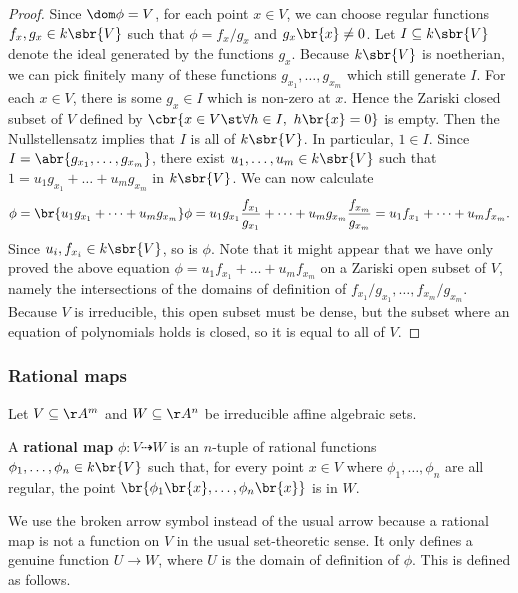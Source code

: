 \begin{proof}
Since $ \dom \phi = V $, for each point $ x \in V $, we can choose regular functions $ f_x, g_x \in k\sbr{V} $ such that $ \phi = f_x / g_x $ and $ g_x\br{x} \ne 0 $. Let $ I \subseteq k\sbr{V} $ denote the ideal generated by the functions $ g_x $. Because $ k\sbr{V} $ is noetherian, we can pick finitely many of these functions $ g_{x_1}, \dots, g_{x_m} $ which still generate $ I $. For each $ x \in V $, there is some $ g_x \in I $ which is non-zero at $ x $. Hence the Zariski closed subset of $ V $ defined by $ \cbr{x \in V \st \forall h \in I, \ h\br{x} = 0} $ is empty. Then the Nullstellensatz implies that $ I $ is all of $ k\sbr{V} $. In particular, $ 1 \in I $. Since $ I = \abr{g_{x_1}, \dots, g_{x_m}} $, there exist $ u_1, \dots, u_m \in k\sbr{V} $ such that $ 1 = u_1g_{x_1} + \dots + u_mg_{x_m} $ in $ k\sbr{V} $. We can now calculate
$$ \phi = \br{u_1g_{x_1} + \dots + u_mg_{x_m}}\phi = u_1g_{x_1}\dfrac{f_{x_1}}{g_{x_1}} + \dots + u_mg_{x_m}\dfrac{f_{x_m}}{g_{x_m}} = u_1f_{x_1} + \dots + u_mf_{x_m}. $$
Since $ u_i, f_{x_i} \in k\sbr{V} $, so is $ \phi $. Note that it might appear that we have only proved the above equation $ \phi = u_1f_{x_1} + \dots + u_mf_{x_m} $ on a Zariski open subset of $ V $, namely the intersections of the domains of definition of $ f_{x_1} / g_{x_1}, \dots, f_{x_m} / g_{x_m} $. Because $ V $ is irreducible, this open subset must be dense, but the subset where an equation of polynomials holds is closed, so it is equal to all of $ V $.
\end{proof}

\subsubsection{Rational maps}

Let $ V \subseteq \AA^m $ and $ W \subseteq \AA^n $ be irreducible affine algebraic sets.

\begin{definition*}
A \textbf{rational map} $ \phi : V \dashrightarrow W $ is an $ n $-tuple of rational functions $ \phi_1, \dots, \phi_n \in k\br{V} $ such that, for every point $ x \in V $ where $ \phi_1, \dots, \phi_n $ are all regular, the point $ \br{\phi_1\br{x}, \dots, \phi_n\br{x}} $ is in $ W $.
\end{definition*}

We use the broken arrow symbol instead of the usual arrow because a rational map is not a function on $ V $ in the usual set-theoretic sense. It only defines a genuine function $ U \to W $, where $ U $ is the domain of definition of $ \phi $. This is defined as follows.

